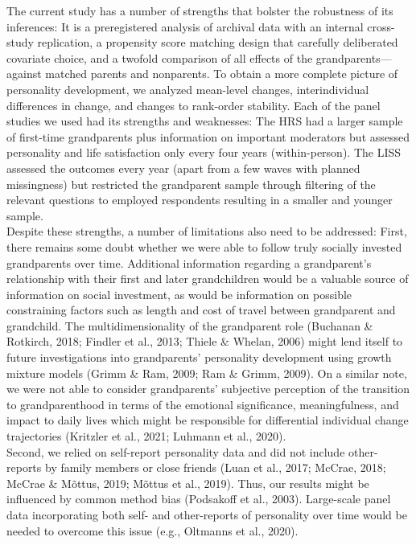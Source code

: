 \documentclass[
  english,
  man, noextraspace]{apa7}
\begin{document}
The current study has a number of strengths that bolster the robustness of its inferences: It is a preregistered analysis of archival data with an internal cross-study replication, a propensity score matching design that carefully deliberated covariate choice, and a twofold comparison of all effects of the grandparents---against matched parents and nonparents. To obtain a more complete picture of personality development, we analyzed mean-level changes, interindividual differences in change, and changes to rank-order stability. Each of the panel studies we used had its strengths and weaknesses: The HRS had a larger sample of first-time grandparents plus information on important moderators but assessed personality and life satisfaction only every four years (within-person). The LISS assessed the outcomes every year (apart from a few waves with planned missingness) but restricted the grandparent sample through filtering of the relevant questions to employed respondents resulting in a smaller and younger sample.\\
Despite these strengths, a number of limitations also need to be addressed: First, there remains some doubt whether we were able to follow truly socially invested grandparents over time. Additional information regarding a grandparent's relationship with their first and later grandchildren would be a valuable source of information on social investment, as would be information on possible constraining factors such as length and cost of travel between grandparent and grandchild. The multidimensionality of the grandparent role (Buchanan \& Rotkirch, 2018; Findler et al., 2013; Thiele \& Whelan, 2006) might lend itself to future investigations into grandparents' personality development using growth mixture models (Grimm \& Ram, 2009; Ram \& Grimm, 2009). On a similar note, we were not able to consider grandparents' subjective perception of the transition to grandparenthood in terms of the emotional significance, meaningfulness, and impact to daily lives which might be responsible for differential individual change trajectories (Kritzler et al., 2021; Luhmann et al., 2020).\\
Second, we relied on self-report personality data and did not include other-reports by family members or close friends (Luan et al., 2017; McCrae, 2018; McCrae \& Mõttus, 2019; Mõttus et al., 2019). Thus, our results might be influenced by common method bias (Podsakoff et al., 2003). Large-scale panel data incorporating both self- and other-reports of personality over time would be needed to overcome this issue (e.g., Oltmanns et al., 2020).\\
\end{document}
